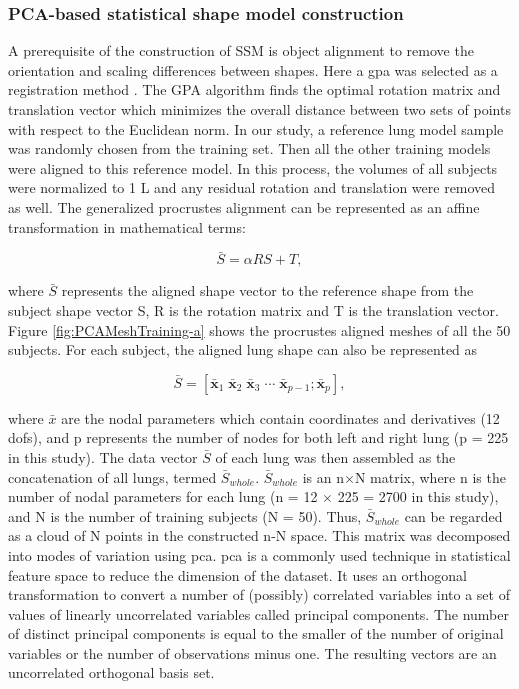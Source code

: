 {%
\subsubsection{PCA-based statistical shape model construction} \label{SSMConstruction}

A prerequisite of the construction of SSM is object alignment to remove the orientation and scaling differences between shapes. Here a \gls{gpa} was selected as a registration method \citep{dryden1998statistical,rohlf1999shape}. The GPA algorithm finds the optimal rotation matrix and translation vector which minimizes the overall distance between two sets of points with respect to the Euclidean norm. In our study, a reference lung model sample was randomly chosen from the training set. Then all the other training models were aligned to this reference model. In this process, the volumes of all subjects were normalized to 1 L and any residual rotation and translation were removed as well. The generalized procrustes alignment can be represented as an affine transformation in mathematical terms:

\begin{equation}
 \label{eq:PCAConstruction1}
 \bar{S} = \alpha RS + T,
\end{equation}

\noindent where $\bar{S}$ represents the aligned shape vector to the reference shape from the subject shape vector S, R is the rotation matrix and T is the translation vector. Figure \ref{fig:PCAMeshTraining-a} shows the procrustes aligned meshes of all the 50 subjects. For each subject, the aligned lung shape can also be represented as 

\begin{equation}
 \label{eq:PCAConstruction2}
 \bar{S} = [\mathbf{\bar{x}}_1 \; \mathbf{\bar{x}}_2 \; \mathbf{\bar{x}}_3 \; \cdots \; \mathbf{\bar{x}}_{p-1}; \mathbf{\bar{x}}_p],
\end{equation}

\noindent where $\bar{x}$ are the nodal parameters which contain coordinates and derivatives (12 \gls{dof}s), and p represents the number of nodes for both left and right lung (p = 225 in this study). The data vector $\bar{S}$ of each lung was then assembled as the concatenation of all lungs, termed $\bar{S}_{whole}$. $\bar{S}_{whole}$ is an n$\times$N matrix, where n is the number of nodal parameters for each lung (n = 12 $\times$ 225 = 2700 in this study), and N is the number of training subjects (N = 50). Thus, $\bar{S}_{whole}$ can be regarded as a cloud of N points in the constructed n-N space. This matrix was decomposed into modes of variation using \gls{pca}. \gls{pca} is a commonly used technique in statistical feature space to reduce the dimension of the dataset. It uses an orthogonal transformation to convert a number of (possibly) correlated variables into a set of values of linearly uncorrelated variables called principal components. The number of distinct principal components is equal to the smaller of the number of original variables or the number of observations minus one. The resulting vectors are an uncorrelated orthogonal basis set. 

}
